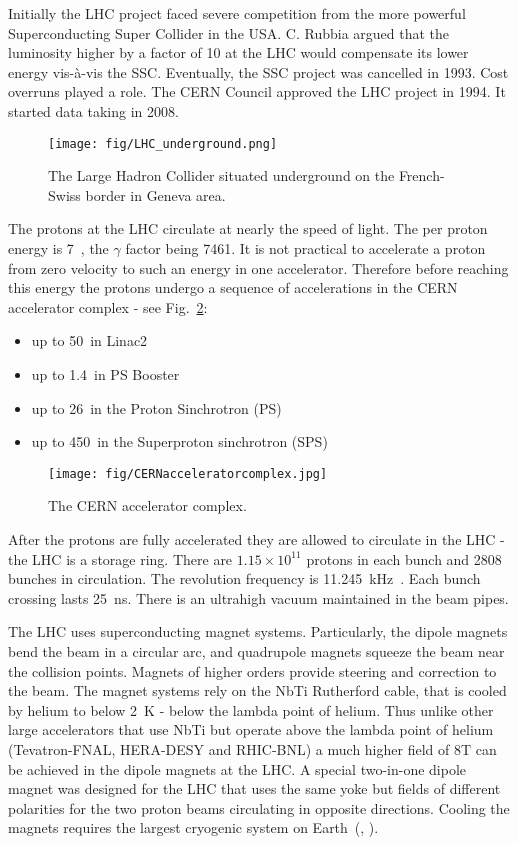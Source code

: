 Initially the LHC project faced severe competition from the more powerful Superconducting Super Collider in the USA. C. Rubbia argued that the luminosity higher by a factor of 10 at the LHC would compensate its lower energy vis-à-vis the SSC. Eventually, the SSC project was cancelled in 1993. Cost overruns played a role. The CERN Council approved the LHC project in 1994. It started data taking in 2008.

\begin{figure}[htpb]
  \centering
  \texttt{[image: fig/LHC\_underground.png]}
  \caption{The Large Hadron Collider situated underground on the French-Swiss border in Geneva area.}
  \label{fig:LHC_underground}
\end{figure}

The protons at the LHC circulate at nearly the speed of light. The per proton energy is 7~\TeV, the $\gamma$ factor being 7461. It is not practical to accelerate a proton from zero velocity to such an energy in one accelerator. Therefore before reaching this energy the protons undergo a sequence of accelerations in the CERN accelerator complex - see Fig.~\ref{fig:CERN_accelerator_complex}:

\begin{itemize}
\item up to 50~\MeV in Linac2
\item up to 1.4~\GeV in PS Booster
\item up to 26~\GeV in the Proton Sinchrotron (PS)
\item up to 450~\GeV in the Superproton sinchrotron (SPS)
\end{itemize}

\begin{figure}[htpb]
  \centering
  \texttt{[image: fig/CERNacceleratorcomplex.jpg]}
  \caption{The CERN accelerator complex.}
  \label{fig:CERN_accelerator_complex}
\end{figure}

After the protons are fully accelerated they are allowed to circulate in the LHC - the LHC is a storage ring. There are $1.15\times10^{11}$ protons in each bunch and 2808 bunches in circulation. The revolution frequency is 11.245~kHz~\cite{Bruning:2004ej}. Each bunch crossing lasts 25~ns. There is an ultrahigh vacuum maintained in the beam pipes.

The LHC uses superconducting magnet systems. Particularly, the dipole magnets bend the beam in a circular arc, and quadrupole magnets squeeze the beam near the collision points. Magnets of higher orders provide steering and correction to the beam. The magnet systems rely on the NbTi Rutherford cable, that is cooled by helium to below 2~K - below the lambda point of helium. Thus unlike other large accelerators that use NbTi but operate above the lambda point of helium (Tevatron-FNAL, HERA-DESY and RHIC-BNL) a much higher field of 8T can be achieved in the dipole magnets at the LHC. A special two-in-one dipole magnet was designed for the LHC that uses the same yoke but fields of different polarities for the two proton beams circulating in opposite directions. Cooling the magnets requires the largest cryogenic system on Earth~(\cite{MYERS:2013hra}, \cite{Evans:2008zzb}).

